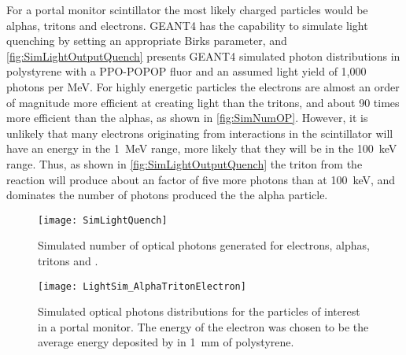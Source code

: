For a portal monitor scintillator the most likely charged particles would be alphas, tritons and electrons.
GEANT4 has the capability to simulate light quenching by setting an appropriate Birks parameter, and \autoref{fig:SimLightOutputQuench} presents GEANT4 simulated photon distributions in polystyrene with a PPO-POPOP fluor and an assumed light yield of 1,000 photons per MeV.
For highly energetic particles the electrons are almost an order of magnitude more efficient at creating light than the tritons, and about 90 times more efficient than the alphas, as shown in \autoref{fig:SimNumOP}.
However, it is unlikely that many electrons originating from  interactions in the scintillator will have an energy in the \SI{1}{\MeV} range, more likely that they will be in the \SI{100}{\keV} range.
Thus, as shown in \autoref{fig:SimLightOutputQuench} the triton from the  reaction will produce about an factor of five more photons than at \SI{100}{\keV}, and dominates the number of photons produced the the alpha particle.
\begin{figure}
  \centering
    \texttt{[image: SimLightQuench]}
    \caption[Simulated Number of Optical Photons for Various Ions and Energies]{Simulated number of optical photons generated for electrons, alphas, tritons and .\LightQuenchSimGeo}
	\label{fig:SimNumOP}
  \end{figure}
  \begin{figure}
	\centering
    \texttt{[image: LightSim\_AlphaTritonElectron]}
  \caption[GEANT4 simulated light output of alpha, tritons and electrons in polystyrene]{Simulated optical photons distributions for the particles of interest in a portal monitor.  The energy of the electron was chosen to be the average energy deposited by  in \SI{1}{\mm} of polystyrene. \LightQuenchSimGeo}
  \label{fig:SimLightOutputQuench}
\end{figure}

